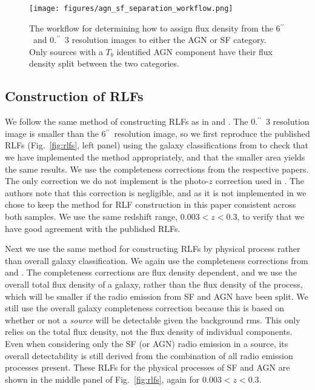 \documentclass[usenatbib,fleqn,letters]{mnras}
\newcommand{\sarc}{$^{\prime\prime}\!\!$}
\begin{document}
\begin{figure}
    \centering
    \texttt{[image: figures/agn\_sf\_separation\_workflow.png]}
    \caption{The workflow for determining how to assign flux density from the 6\sarc\ and 0.\sarc\ 3 resolution images to either the AGN or SF category. Only sources with a $T_b$ identified AGN component have their flux density split between the two categories.}
    \label{fig:flowchart}
\end{figure}

\subsection{Construction of RLFs}

We follow the same method of constructing RLFs as in \cite{kondapally_cosmic_2022} and \cite{cochrane_lofar_2023}. The 0.\sarc\ 3 resolution image is smaller than the 6\sarc\ resolution image, so we first reproduce the published RLFs (Fig.~\ref{fig:rlfs}, left panel) using the galaxy classifications from  to check that we have implemented the method appropriately, and that the smaller area yields the same results. We use the completeness corrections from the respective papers. The only correction we do not implement is the photo-$z$ correction used in \cite{cochrane_lofar_2023}. The authors note that this correction is negligible, and as it is not implemented in \cite{kondapally_cosmic_2022} we chose to keep the method for RLF construction in this paper consistent across both samples. We use the same redshift range, $0.003 < z < 0.3$, to verify that we have good agreement with the published RLFs.

Next we use the same method for constructing RLFs by physical process rather than overall galaxy classification. We again use the completeness corrections from \cite{cochrane_lofar_2023} and \cite{kondapally_cosmic_2022}. The completeness corrections are flux density dependent, and we use the overall total flux density of a galaxy, rather than the flux density of the process, which will be smaller if the radio emission from SF and AGN have been split. We still use the overall galaxy completeness correction because this is based on whether or not a \textit{source} will be detectable given the background rms. This only relies on the total flux density, not the flux density of individual components. Even when considering only the SF (or AGN) radio emission in a source, its overall detectability is still derived from the combination of all radio emission processes present. These RLFs for the physical processes of SF and AGN are shown in the middle panel of Fig.~\ref{fig:rlfs}, again for  $0.003 < z < 0.3$. 
\end{document}
